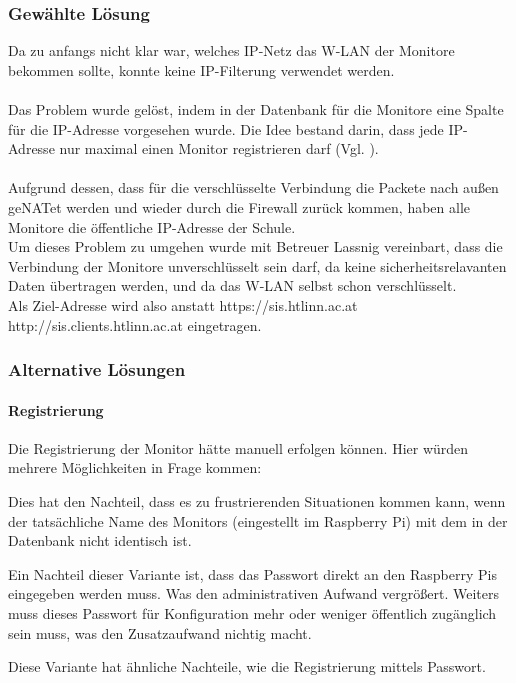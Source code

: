 \subsubsection{Gewählte Lösung}

Da zu anfangs nicht klar war, welches IP-Netz das W-LAN der Monitore bekommen sollte, konnte keine IP-Filterung verwendet werden.\\
\\
Das Problem wurde gelöst, indem in der Datenbank für die Monitore eine Spalte für die IP-Adresse vorgesehen wurde. Die Idee bestand darin, dass jede IP-Adresse nur maximal einen Monitor registrieren darf (Vgl. ).\\
\\
Aufgrund dessen, dass für die verschlüsselte Verbindung die Packete nach außen geNATet werden und wieder durch die Firewall zurück kommen, haben alle Monitore die öffentliche IP-Adresse der Schule.\\
Um dieses Problem zu umgehen wurde mit Betreuer Lassnig vereinbart, dass die Verbindung der Monitore unverschlüsselt sein darf, da keine sicherheitsrelavanten Daten übertragen werden, und da das W-LAN selbst schon verschlüsselt.\\
Als Ziel-Adresse wird also anstatt https://sis.htlinn.ac.at http://sis.clients.htlinn.ac.at eingetragen.


\subsubsection{Alternative Lösungen}

\paragraph{Registrierung}
\label{sec:content_solutions_monitors_alt_reg}

Die Registrierung der Monitor hätte manuell erfolgen können. Hier würden mehrere Möglichkeiten in Frage kommen:

\begin{description}[style=nextline]
	\item[Registrierung nur vom Administrator-Interface aus]
		Dies hat den Nachteil, dass es zu frustrierenden Situationen kommen kann, wenn der tatsächliche Name des Monitors (eingestellt im Raspberry Pi) mit dem in der Datenbank nicht identisch ist.\\
	\item[Registrierung mittels Passwort]
		Ein Nachteil dieser Variante ist, dass das Passwort direkt an den Raspberry Pis eingegeben werden muss. Was den administrativen Aufwand vergrößert.
		Weiters muss dieses Passwort für Konfiguration mehr oder weniger öffentlich zugänglich sein muss, was den Zusatzaufwand nichtig macht.
	\item[Registrierung mittels Cookie-Hash]
		Diese Variante hat ähnliche Nachteile, wie die Registrierung mittels Passwort.
\end{description}

